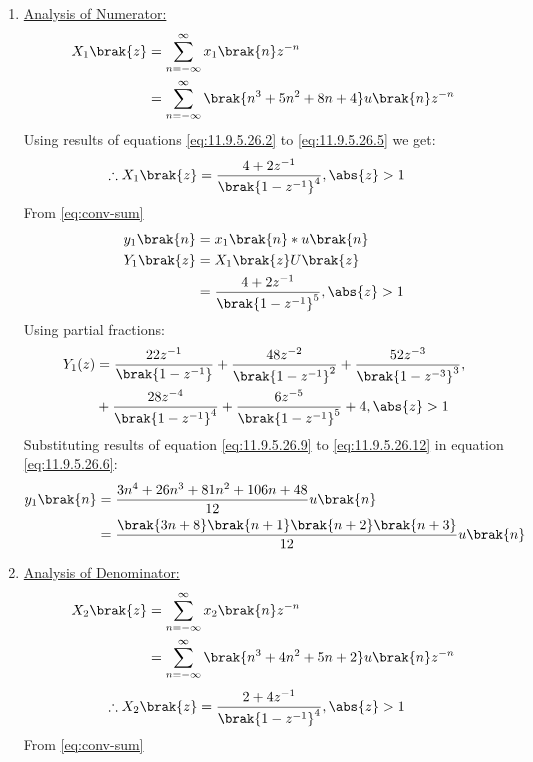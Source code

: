 \documentclass[journal,12pt,twocolumn]{IEEEtran}
\theoremstyle{remark}
\begin{document}
\begin{enumerate}[label=\arabic*.]
\item \underline {Analysis of Numerator:}\\
\begin{align}
 X_1\brak{z} &= \sum_{n=-\infty}^\infty x_1\brak{n}  z^{-n}\\
             &= \sum_{n=-\infty}^\infty \brak{n^{3} + 5n^{2} + 8n + 4} u\brak{n} z^{-n}
\end{align}
Using results of equations \eqref{eq:11.9.5.26.2} to \eqref{eq:11.9.5.26.5} we get:
\begin{align}
 \therefore   X_1\brak{z}&= \frac{4+2z^{-1}}{\brak{1-z^{-1}}^4} ,   \abs{z} >1 
\end{align}
From \eqref{eq:conv-sum}
\begin{align}
y_1\brak{n} &= x_1\brak{n}\ast u\brak{n}\\
    Y_1\brak{z} &= X_1\brak{z} U\brak{z} \\
 &= \frac{4+2z^{-1}}{\brak{1-z^{-1}}^5} , \abs{z}> 1 
\end{align}
Using partial fractions:
\begin{align}
    Y_1(z) &= \frac{22z^{-1}}{\brak{1-z^{-1}}} + \frac{48z^{-2}}{\brak{1-z^{-1}}^2} + \frac{52z^{-3}}{\brak{1-z^{-3}}^3} , \label{eq:11.9.5.26.6}\\
    &+ \frac{28z^{-4}}{\brak{1-z^{-1}}^4}+\frac{6z^{-5}}{\brak{1-z^{-1}}^5}+4 , \abs{z}>1 \notag 
\end{align}
Substituting results of equation \eqref{eq:11.9.5.26.9} to \eqref{eq:11.9.5.26.12} in equation \eqref{eq:11.9.5.26.6}:
\begin{align}
    y_1\brak{n} &= \frac{3n^4 + 26n^3 + 81n^2 + 106n + 48}{12}u\brak{n}\\
    &= \frac{\brak{3n+8}\brak{n+1}\brak{n+2}\brak{n+3}}{12}u\brak{n}
\end{align}
\item \underline{Analysis of Denominator:}
\begin{align}
    X_2\brak{z} &= \sum_{n=-\infty}^\infty x_2\brak{n} z^{-n}\\
                &= \sum_{n=-\infty}^\infty \brak{n^{3}+4n^{2}+5n+2} u\brak{n} z^{-n}
\end{align}
\begin{align}
   \therefore  X_2\brak{z} &= \frac{2+4z^{-1}}{\brak{1-z^{-1}}^4},   \abs{z} >1   
\end{align}
From \eqref{eq:conv-sum}

\end{enumerate}
\end{document}
